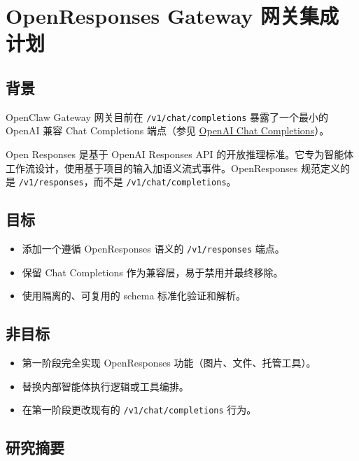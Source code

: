 \clearpage

\section{OpenResponses Gateway 网关集成计划}


\subsection{背景}


OpenClaw Gateway 网关目前在 \texttt{/v1/chat/completions} 暴露了一个最小的 OpenAI 兼容 Chat Completions 端点（参见 \href{/gateway/openai-http-api}{OpenAI Chat Completions}）。

Open Responses 是基于 OpenAI Responses API 的开放推理标准。它专为智能体工作流设计，使用基于项目的输入加语义流式事件。OpenResponses 规范定义的是 \texttt{/v1/responses}，而不是 \texttt{/v1/chat/completions}。

\subsection{目标}


\begin{itemize}
  \item 添加一个遵循 OpenResponses 语义的 \texttt{/v1/responses} 端点。
  \item 保留 Chat Completions 作为兼容层，易于禁用并最终移除。
  \item 使用隔离的、可复用的 schema 标准化验证和解析。
\end{itemize}


\subsection{非目标}


\begin{itemize}
  \item 第一阶段完全实现 OpenResponses 功能（图片、文件、托管工具）。
  \item 替换内部智能体执行逻辑或工具编排。
  \item 在第一阶段更改现有的 \texttt{/v1/chat/completions} 行为。
\end{itemize}


\subsection{研究摘要}


